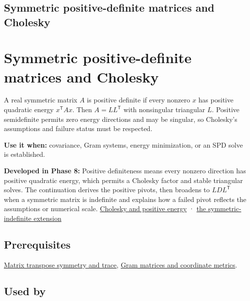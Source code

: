 \hypertarget{appendix-50d2ea3c9b26}{}
\section*{Symmetric positive-definite matrices and Cholesky}
\chapter{Symmetric positive-definite matrices and Cholesky}\label{appendix-50d2ea3c9b26-symmetric-positive-definite-matrices-and-cholesky}

A real symmetric matrix \(A\) is positive definite if every nonzero \(x\) has positive quadratic energy \(x^\mathsf T A x\). Then \(A=LL^\mathsf T\) with nonsingular triangular \(L\). Positive semidefinite permits zero energy directions and may be singular, so Cholesky's assumptions and failure status must be respected.

\textbf{Use it when:} covariance, Gram systems, energy minimization, or an SPD solve is established.

\textbf{Developed in Phase 8:} Positive definiteness means every nonzero direction has positive quadratic energy, which permits a Cholesky factor and stable triangular solves. The continuation derives the positive pivots, then broadens to \(LDL^\mathsf T\) when a symmetric matrix is indefinite and explains how a failed pivot reflects the assumptions or numerical scale. \href{Continuous\%20Notes/Computing\%20Foundations\%20-\%20From\%20Bits\%20to\%20C++\%20and\%20Systems\%20APIs\#Positive\%20definiteness\%20is\%20a\%20structural\%20promise}{Cholesky and positive energy} · \href{Continuous\%20Notes/Computing\%20Foundations\%20-\%20From\%20Bits\%20to\%20C++\%20and\%20Systems\%20APIs\#LDLT\%20reaches\%20symmetric\%20indefinite\%20matrices}{the symmetric-indefinite extension}

\section{Prerequisites}\label{appendix-50d2ea3c9b26-prerequisites}

\hyperref[appendix-175ca5ff874d]{Matrix transpose symmetry and trace}, \hyperref[appendix-3b863809f82a]{Gram matrices and coordinate metrics}.

\section{Used by}\label{appendix-50d2ea3c9b26-used-by}

